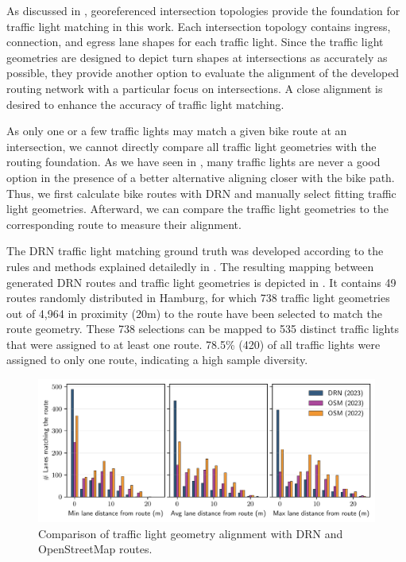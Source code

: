 As discussed in , georeferenced intersection topologies provide the foundation for traffic light matching in this work. Each intersection topology contains ingress, connection, and egress lane shapes for each traffic light. Since the traffic light geometries are designed to depict turn shapes at intersections as accurately as possible, they provide another option to evaluate the alignment of the developed routing network with a particular focus on intersections. A close alignment is desired to enhance the accuracy of traffic light matching.

As only one or a few traffic lights may match a given bike route at an intersection, we cannot directly compare all traffic light geometries with the routing foundation. As we have seen in , many traffic lights are never a good option in the presence of a better alternative aligning closer with the bike path. Thus, we first calculate bike routes with DRN and manually select fitting traffic light geometries. Afterward, we can compare the traffic light geometries to the corresponding route to measure their alignment. 

The DRN traffic light matching ground truth was developed according to the rules and methods explained detailedly in . The resulting mapping between generated DRN routes and traffic light geometries is depicted in . It contains 49 routes randomly distributed in Hamburg, for which 738 traffic light geometries out of 4,964 in proximity (20m) to the route have been selected to match the route geometry. These 738 selections can be mapped to 535 distinct traffic lights that were assigned to at least one route. 78.5\% (420) of all traffic lights were assigned to only one route, indicating a high sample diversity.

\begin{figure}[t]
\centering 
\includegraphics[width=\linewidth]{images/routing-lane-alignment.pdf}
\caption{Comparison of traffic light geometry alignment with DRN and OpenStreetMap routes.}
\label{fig:routing-lane-alignment}
\end{figure}

